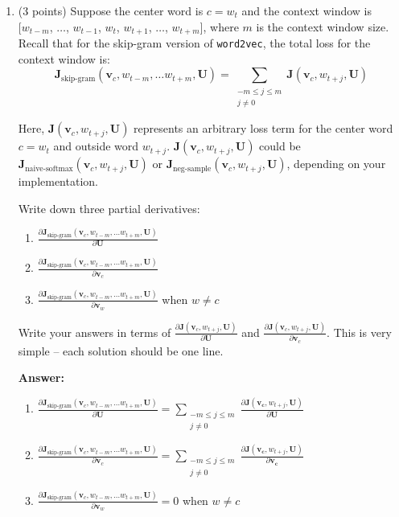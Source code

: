 \documentclass{article}
\newenvironment{answer}{
    {\bf Answer:} \sf \begingroup\color{red}
}{\endgroup}%
\begin{document}
\begin{enumerate}[label=(\alph*)]
\item (3 points) Suppose the center word is $c = w_t$ and the context window is $[w_{t-m}$, $\ldots$, $w_{t-1}$, $w_{t}$, $w_{t+1}$, $\ldots$, $w_{t+m}]$, where $m$ is the context window size. Recall that for the  skip-gram version of {\tt word2vec}, the total loss for the context window is:
\begin{equation}
\label{skip-gram}
\bm J_{\textrm{skip-gram}}(\bm v_c, w_{t-m},\ldots w_{t+m}, \bm U) = \sum_{\substack{-m\le j \le m \\ j\ne 0}} \bm J(\bm v_c, w_{t+j}, \bm U)
\end{equation}

Here, $\bm J(\bm v_c, w_{t+j}, \bm U)$ represents an arbitrary loss term for the center word $c=w_t$ and outside word $w_{t+j}$. $\bm J(\bm v_c, w_{t+j}, \bm U)$ could be $\bm J_{\text{naive-softmax}}(\bm v_c, w_{t+j}, \bm U)$ or $\bm J_{\text{neg-sample}}(\bm v_c, w_{t+j}, \bm U)$, depending on your implementation.

Write down three partial derivatives: 
\begin{enumerate}[label=(\roman*)]
    \item ${\frac{\partial \bm J_{\textrm{skip-gram}}(\bm v_c, w_{t-m},\ldots w_{t+m}, \bm U)} {\partial \bm U}}$
    \item ${\frac{\partial \bm J_{\textrm{skip-gram}}(\bm v_c, w_{t-m},\ldots w_{t+m}, \bm U)} {\partial \bm v_c}}$
    \item ${\frac{\partial \bm J_{\textrm{skip-gram}}(\bm v_c, w_{t-m},\ldots w_{t+m}, \bm U)} {\partial \bm v_w}}$ when $w \ne c$
\end{enumerate}
Write your answers in terms of ${\frac{\partial \bm J(\bm v_c, w_{t+j}, \bm U)}{\partial \bm U}}$ and ${\frac{\partial \bm J(\bm v_c, w_{t+j}, \bm U)}{\partial \bm v_c}}$. This is very simple -- each solution should be one line.

\begin{shaded}
\begin{answer}
\begin{enumerate}[label=(\roman*)]
    \item ${\frac{\partial \bm J_{\textrm{skip-gram}}(\bm v_c, w_{t-m},\ldots w_{t+m}, \bm U)} {\partial \bm U}} = \sum_{\substack{-m \le j \le m \\ j \ne 0}} \frac{\partial \bm{J} (\bm{v_c},w_{t+j},\bm{U})}{\partial \bm{U}}$
    \item ${\frac{\partial \bm J_{\textrm{skip-gram}}(\bm v_c, w_{t-m},\ldots w_{t+m}, \bm U)} {\partial \bm v_c}} = \sum_{\substack{-m \le j \le m \\ j \ne 0}} \frac{\partial \bm{J} (\bm{v_c},w_{t+j},\bm{U})}{\partial \bm{v_c}}$
    \item ${\frac{\partial \bm J_{\textrm{skip-gram}}(\bm v_c, w_{t-m},\ldots w_{t+m}, \bm U)} {\partial \bm v_w}} = 0$ when $w \ne c$
\end{enumerate}
\end{answer}
\end{shaded}


\end{enumerate}
\end{document}
